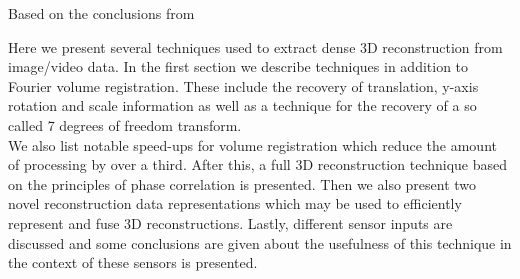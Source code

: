 
Based on the conclusions from 

Here we present several techniques used to extract dense 3D reconstruction from image/video data. In the first section we describe techniques in addition to Fourier volume registration. These include the recovery of translation, y-axis rotation and scale information as well as a technique for the recovery of a so called 7 degrees of freedom transform. \\

We also list notable speed-ups for volume registration which reduce the amount of processing by over a third. After this, a full 3D reconstruction technique based on the principles of phase correlation is presented. Then we also present two novel reconstruction data representations which may be used to efficiently represent and fuse 3D reconstructions. Lastly, different sensor inputs are discussed and some conclusions are given about the usefulness of this technique in the context of these sensors is presented.

